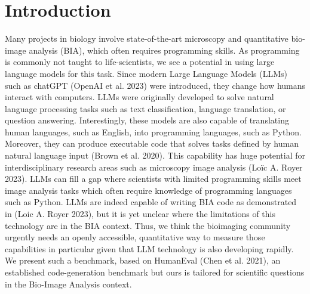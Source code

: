 \documentclass{ecai}
\begin{document}

\section{Introduction}

Many projects in biology involve state-of-the-art microscopy and  quantitative bio-image analysis (BIA), which often requires programming skills. As programming is commonly not taught to life-scientists, we see a potential in using large language models for this task. Since modern Large Language Models (LLMs) such as chatGPT (OpenAI et al. 2023) were introduced, they change how humans interact with computers. LLMs were originally developed to solve  natural language processing tasks such as  text classification, language translation, or question answering. Interestingly, these models  are also capable of translating human languages, such as English, into programming languages, such as Python. Moreover, they can produce executable code that solves tasks defined by human natural language input (Brown et al. 2020). This capability has huge potential for interdisciplinary research areas such as microscopy image analysis (Loïc A. Royer 2023). LLMs can fill a gap where scientists with limited programming skills meet image analysis tasks which often require knowledge of programming languages such as Python. LLMs are indeed capable of writing BIA code as demonstrated in (Loic A. Royer 2023), but it is yet unclear where the limitations of this technology are in the BIA context. Thus, we think the bioimaging community urgently needs an openly accessible, quantitative way to measure those capabilities in particular given that LLM technology is also developing rapidly. We present such a benchmark, based on HumanEval (Chen et al. 2021), an established code-generation benchmark but ours is tailored for scientific questions in the Bio-Image Analysis context.
\end{document}
